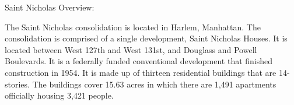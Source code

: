 Saint Nicholas Overview:  

 

The Saint Nicholas consolidation is located in Harlem, Manhattan. The consolidation is comprised of a single development, Saint Nicholas Houses. It is located between West 127th and West 131st, and Douglass and Powell Boulevards. It is a federally funded conventional development that finished construction in 1954. It is made up of thirteen residential buildings that are 14-stories. The buildings cover 15.63 acres in which there are 1,491 apartments officially housing 3,421 people.  